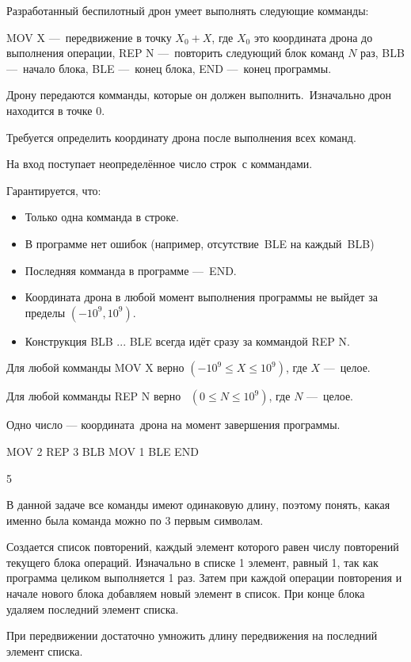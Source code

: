 
Разработанный беспилотный дрон умеет выполнять следующие комманды:

MOV X — передвижение в точку $X_0 + X$, где $X_0$ это координата дрона до выполнения операции,
REP N — повторить следующий блок команд $N$ раз,
BLB — начало блока,
BLE — конец блока,
END — конец программы.

Дрону передаются комманды, которые он должен выполнить. Изначально дрон находится в точке $0$.

Требуется определить координату дрона после выполнения всех команд.


На вход поступает неопределённое число строк с коммандами.

Гарантируется, что:

\begin{itemize}
\item Только одна комманда в строке.
\item В программе нет ошибок (например, отсутствие BLE на каждый BLB)
\item Последняя комманда в программе — END.
\item Координата дрона в любой момент выполнения программы не выйдет за пределы $(-10^9, 10^9)$.
\item Конструкция BLB ... BLE всегда идёт сразу за коммандой REP N.
\end{itemize}

Для любой комманды MOV X верно $(-10^9 \leq X \leq 10^9)$, где $X$ — целое.

Для любой комманды REP N верно  $(0 \leq N \leq 10^9)$, где $N$ — целое.


\outputfmtSection

Одно число — координата дрона на момент завершения программы.


\begin{myverbbox}[\small]{\vinput}
    MOV 2 
    REP 3 
    BLB 
    MOV 1 
    BLE
    END
\end{myverbbox}

\begin{myverbbox}[\small]{\voutput}
    5
\end{myverbbox}

\solutionSection

В данной задаче все команды имеют одинаковую длину, поэтому понять, какая именно была команда можно по 3 первым символам.

Создается список повторений, каждый элемент которого равен числу повторений текущего блока операций. Изначально в списке 1 элемент, равный 1, так как программа целиком выполняется 1 раз. Затем при каждой операции повторения и начале нового блока добавляем новый элемент в список. При конце блока удаляем последний элемент списка.

При передвижении достаточно умножить длину передвижения на последний элемент списка.


